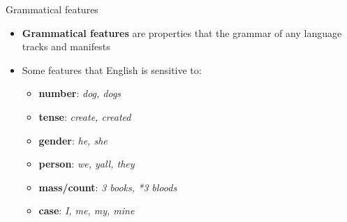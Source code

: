 \documentclass[10pt, compress]{beamer}
\begin{document}
\begin{frame}{Grammatical features}
	\begin{itemize}
		\item \textbf{Grammatical features} are properties that the grammar of any language tracks and manifests
		\item Some features that English is sensitive to:
		\begin{itemize}
			\item \textbf{number}: \emph{dog, dogs}
			\item \textbf{tense}: \emph{create, created}
			\item \textbf{gender}: \emph{he, she}
			\item \textbf{person}: \emph{we, yall, they}
			\item \textbf{mass/count}: \emph{3 books, *3 bloods}
			\item \textbf{case}: \emph{I, me, my, mine}
		\end{itemize}
	\end{itemize}
\end{frame}
\end{document}
